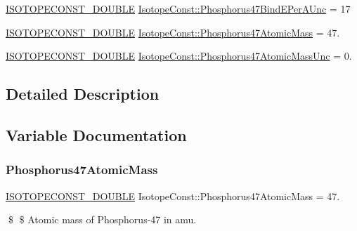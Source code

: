 \begin{DoxyCompactItemize}
\mbox{\hyperlink{group___isotope_const-_macros_ga8f45a7272ce02c0b4c65c44636ed719a}{I\+S\+O\+T\+O\+P\+E\+C\+O\+N\+S\+T\+\_\+\+D\+O\+U\+B\+LE}} \mbox{\hyperlink{group___isotope_const-_phosphorus-_p47_ga5ceab47dc3d4f2844dd989d5f877078d}{Isotope\+Const\+::\+Phosphorus47\+Bind\+E\+Per\+A\+Unc}} = 17
\item 
\mbox{\hyperlink{group___isotope_const-_macros_ga8f45a7272ce02c0b4c65c44636ed719a}{I\+S\+O\+T\+O\+P\+E\+C\+O\+N\+S\+T\+\_\+\+D\+O\+U\+B\+LE}} \mbox{\hyperlink{group___isotope_const-_phosphorus-_p47_gab8202e61cf7e7e521b881fc7fb253c58}{Isotope\+Const\+::\+Phosphorus47\+Atomic\+Mass}} = 47.
\item 
\mbox{\hyperlink{group___isotope_const-_macros_ga8f45a7272ce02c0b4c65c44636ed719a}{I\+S\+O\+T\+O\+P\+E\+C\+O\+N\+S\+T\+\_\+\+D\+O\+U\+B\+LE}} \mbox{\hyperlink{group___isotope_const-_phosphorus-_p47_ga490a03b713cf49ef9f0177478e59f72a}{Isotope\+Const\+::\+Phosphorus47\+Atomic\+Mass\+Unc}} = 0.
\end{DoxyCompactItemize}


\subsection{Detailed Description}


\subsection{Variable Documentation}
\mbox{\label{group___isotope_const-_phosphorus-_p47_gab8202e61cf7e7e521b881fc7fb253c58}} 
\subsubsection{\texorpdfstring{Phosphorus47\+Atomic\+Mass}{Phosphorus47AtomicMass}}
{\footnotesize\ttfamily \mbox{\hyperlink{group___isotope_const-_macros_ga8f45a7272ce02c0b4c65c44636ed719a}{I\+S\+O\+T\+O\+P\+E\+C\+O\+N\+S\+T\+\_\+\+D\+O\+U\+B\+LE}} Isotope\+Const\+::\+Phosphorus47\+Atomic\+Mass = 47.}

\$ \$ Atomic mass of Phosphorus-\/47 in amu. \mbox{\label{group___isotope_const-_phosphorus-_p47_ga490a03b713cf49ef9f0177478e59f72a}} 
